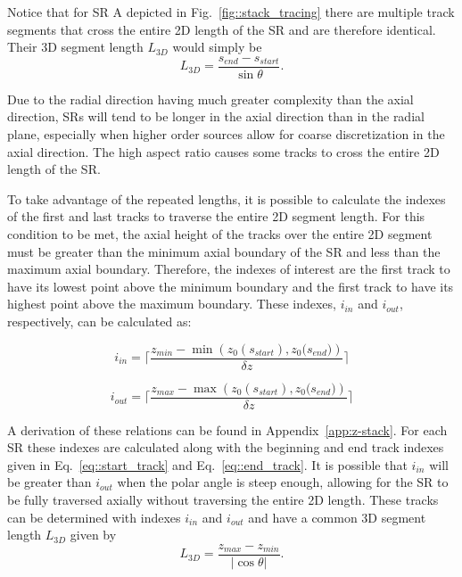 Notice that for \ac{SR} A depicted in Fig.~\ref{fig::stack_tracing} there are multiple track segments that cross the entire 2D length of the \ac{SR} and are therefore identical. Their 3D segment length $L_{3D}$ would simply be
\begin{equation}
L_{3D} = \frac{s_{\textit{end}} - s_{\textit{start}}}{\sin{\theta}}.
\end{equation}

Due to the radial direction having much greater complexity than the axial direction, \ac{SR}s will tend to be longer in the axial direction than in the radial plane, especially when higher order sources allow for coarse discretization in the axial direction. The high aspect ratio causes some tracks to cross the entire 2D length of the \ac{SR}.

To take advantage of the repeated lengths, it is possible to calculate the indexes of the first and last tracks to traverse the entire 2D segment length. For this condition to be met, the axial height of the tracks over the entire 2D segment must be greater than the minimum axial boundary of the \ac{SR} and less than the maximum axial boundary. Therefore, the indexes of interest are the first track to have its lowest point above the minimum boundary and the first track to have its highest point above the maximum boundary. These indexes, $i_{\textit{in}}$ and $i_{\textit{out}}$, respectively, can be calculated as:

\begin{equation}
i_{\textit{in}} = \Bigg\lceil\frac{z_{\textit{min}} - \min\left({z_0(s_{\textit{start}}), z_0(s_{\textit{end}}})\right) }{\delta z}\Bigg\rceil
\end{equation}

\begin{equation}
i_{\textit{out}} = \Bigg\lceil\frac{z_{\textit{max}} - \max\left({z_0(s_{\textit{start}}), z_0(s_{\textit{end}}})\right) }{\delta z}\Bigg\rceil
\end{equation}

A derivation of these relations can be found in Appendix~\ref{app:z-stack}. For each \ac{SR} these indexes are calculated along with the beginning and end track indexes given in Eq.~\ref{eq::start_track} and Eq.~\ref{eq::end_track}. It is possible that $i_{\textit{in}}$ will be greater than $i_{\textit{out}}$ when the polar angle is steep enough, allowing for the \ac{SR} to be fully traversed axially without traversing the entire 2D length. These tracks can be determined with indexes $i_{\textit{in}}$ and $i_{\textit{out}}$ and have a common 3D segment length $L_{3D}$ given by
\begin{equation}
L_{3D} = \frac{z_{\textit{max}} - z_{\textit{min}}}{\left| \cos{\theta}\right|}.
\end{equation}

